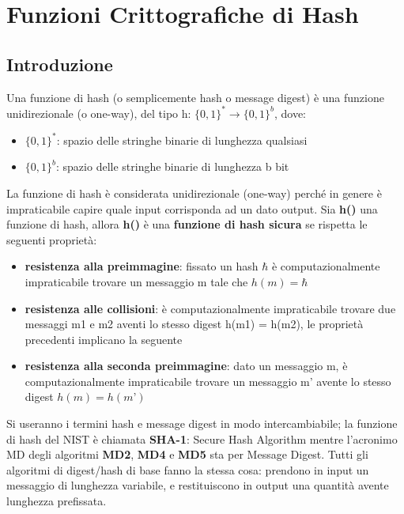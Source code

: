 \chapter{Funzioni Crittografiche di Hash}
\section{Introduzione}
Una funzione di hash (o semplicemente hash o message digest) è una funzione unidirezionale (o one-way), del tipo h: $\{0, 1\}^{*} \rightarrow \{0, 1\}^{b}$, dove:

\begin{itemize}
	\item $\{0, 1\}^{*}$: spazio delle stringhe binarie di lunghezza qualsiasi
	\item $\{0, 1\}^{b}$: spazio delle stringhe binarie di lunghezza b bit
\end{itemize}

La funzione di hash è considerata unidirezionale (one-way) perché in genere è impraticabile capire quale input corrisponda ad un dato output. Sia \textbf{h()} una funzione di hash, allora \textbf{h()} è una \textbf{funzione di hash sicura} se rispetta le seguenti proprietà:

\begin{itemize}
	\item \textbf{resistenza alla preimmagine}: fissato un hash $\hbar$ è computazionalmente impraticabile trovare un messaggio m tale che $h(m) = \hbar$
	\item \textbf{resistenza alle collisioni}: è computazionalmente	impraticabile trovare due messaggi m1 e m2 aventi lo 	stesso digest h(m1) = h(m2), le proprietà precedenti implicano la seguente
	\item \textbf{resistenza alla seconda preimmagine}: dato un messaggio m, è computazionalmente impraticabile trovare un	messaggio m’ avente lo stesso digest $h(m) = h(m’)$
\end{itemize}


Si useranno i termini hash e message digest in modo intercambiabile; la funzione di hash del NIST è chiamata \textbf{SHA-1}: Secure Hash Algorithm mentre l'acronimo MD degli algoritmi \textbf{MD2}, \textbf{MD4} e \textbf{MD5} sta per Message Digest. Tutti gli algoritmi di digest/hash di base fanno la stessa cosa: prendono in input un messaggio di lunghezza variabile, e restituiscono in output una quantità avente lunghezza prefissata. \newline \newline

